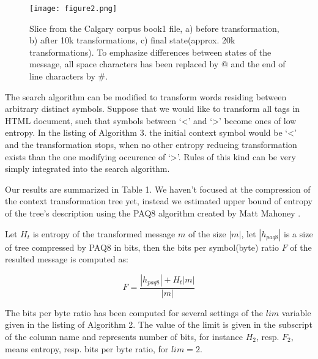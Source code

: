 \documentclass[smallabstract,smallcaptions]{dccpaper}
\begin{document}
\begin{figure}[ht!]
\centering
\texttt{[image: figure2.png]}
\caption{\label{fig:book1-text-cut}%
Slice from the Calgary corpus book1 file, a) before transformation, b) after 10k transformations, c) final state(approx. 20k transformations). To emphasize differences between states of the message, all space characters has been replaced by @ and the end of line characters by \#.}
\end{figure}

The search algorithm can be modified to transform words residing between arbitrary distinct symbols. Suppose that we would like to transform all tags in HTML document, such that symbols between `\textless' and `\textgreater' become ones of low entropy. In the listing of Algorithm 3. the initial context symbol would be `\textless' and the transformation stops, when no other entropy reducing transformation exists than the one modifying occurence of  `\textgreater'. Rules of this kind can be very simply integrated into the search algorithm.

\label{sec:results}

Our results are summarized in Table 1. We haven't focused at the compression of the context transformation tree yet, instead we estimated upper bound of entropy of the tree's description using the PAQ8 algorithm created by Matt Mahoney \cite{paq8}. 

Let $H_t$ is entropy of the transformed message $m$ of the size $|m|$, let $|h_{paq8}|$ is a size of tree compressed by PAQ8 in bits, then the bits per symbol(byte) ratio $F$ of the resulted message is computed as:

\[
F = \frac{|h_{paq8}| + H_t|m|}{|m|}
\]

The bits per byte ratio has been computed for several settings of the $lim$ variable given in the listing of Algorithm 2. The value of the limit is given in the subscript of the column name and represents number of bits, for instance $H_{2}$, resp. $F_{2}$, means entropy, resp. bits per byte ratio, for $lim=2$.
\end{document}
